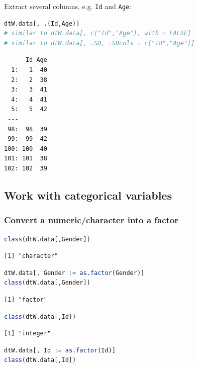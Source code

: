 \documentclass{article}
\begin{document}
Extract several columns, e.g. \texttt{Id} and \texttt{Age}:
\begin{lstlisting}[language=r,numbers=none]
dtW.data[, .(Id,Age)] 
# similar to dtW.data[, c("Id","Age"), with = FALSE]
# similar to dtW.data[, .SD, .SDcols = c("Id","Age")]
\end{lstlisting}

\label{}
\begin{verbatim}
      Id Age
  1:   1  40
  2:   2  38
  3:   3  41
  4:   4  41
  5:   5  42
 ---        
 98:  98  39
 99:  99  42
100: 100  40
101: 101  38
102: 102  39
\end{verbatim}
\subsection{Work with categorical variables}
\label{sec:org9662d36}
\subsubsection{Convert a numeric/character into a factor}
\label{sec:org2d5f273}

\begin{lstlisting}[language=r,numbers=none]
class(dtW.data[,Gender])
\end{lstlisting}

\label{}
\begin{verbatim}
[1] "character"
\end{verbatim}


\begin{lstlisting}[language=r,numbers=none]
dtW.data[, Gender := as.factor(Gender)]
class(dtW.data[,Gender])
\end{lstlisting}

\label{}
\begin{verbatim}
[1] "factor"
\end{verbatim}


\begin{lstlisting}[language=r,numbers=none]
class(dtW.data[,Id])
\end{lstlisting}

\label{}
\begin{verbatim}
[1] "integer"
\end{verbatim}


\begin{lstlisting}[language=r,numbers=none]
dtW.data[, Id := as.factor(Id)]
class(dtW.data[,Id])
\end{lstlisting}
\end{document}
